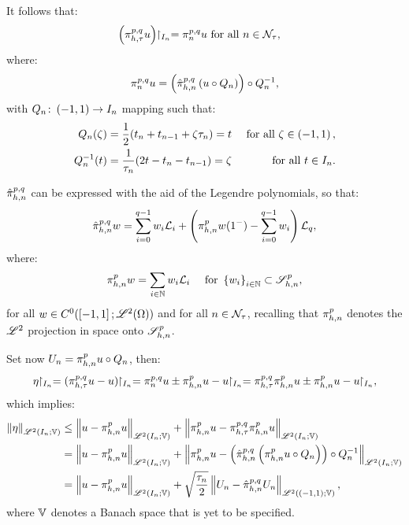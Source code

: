 It follows that:
\begin{align}
    \left( \pi_{h, \tau}^{p, q} u \right) \!\!\restriction_{I_n} = \pi^{p, q}_n u &\text{ for all } n \in \mathcal{N}_{\tau},
\end{align}
where:
\begin{align}
    \pi^{p, q}_n u = \left( \hat{\pi}_{h, n}^{p, q} \left( u \circ Q_n \right) \right) \circ Q_n^{-1},
\end{align}
with $Q_n \colon \left( -1, 1 \right) \rightarrow I_n$ mapping such that:
\begin{align}
    Q_n(\zeta) &= \frac{1}{2}(t_n + t_{n - 1} + \zeta \tau_n) = t &\text{ for all } \zeta \in \left( -1, 1 \right), \\
    Q_n^{-1}(t) &= \frac{1}{\tau_n}(2t - t_n - t_{n - 1}) = \zeta &\text{ for all } t \in I_n.
\end{align}

\begin{lemma} \label{lemma:legendre_interpolant}
    $\hat{\pi}_{h, n}^{p, q}$ can be expressed with the aid of the Legendre polynomials, so that:
    \begin{align}
        \hat{\pi}_{h, n}^{p, q} w = \sum_{i = 0}^{q - 1} w_i \mathcal{L}_i + \left( \pi_{h, n}^p w(1^-) - \sum_{i = 0}^{q - 1} w_i \right) \mathcal{L}_q,
    \end{align}
    where:
    \begin{align}
        \pi_{h, n}^p w &= \sum_{i \in \mathbb{N}} w_i \mathcal{L}_i &\text{ for } \left\{ w_i \right\}_{i \in \mathbb{N}} \subset \mathscr{S}^p_{h, n},
    \end{align}
    for all $w \in C^0(\left[ -1, 1 \right]; \mathscr{L}^{2}(\Omega))$ and for all $n \in \mathcal{N}_{\tau}$, recalling that $\pi_{h, n}^p$ denotes the $\mathscr{L}^{2}$ projection in space onto $\mathscr{S}^p_{h, n}$.
\end{lemma}

Set now $U_n = \pi_{h, n}^p u \circ Q_n$, then:
\begin{align}
    \eta \Restriction_{I_n} = (\InterpolantPQ u - u) \Restriction_{ I_n} = \InterpolantPQI u \pm \InterSol u - u \Restriction_{I_n} = \InterpolantPQ \InterSol u \pm \InterSol u - u \Restriction_{I_n},
\end{align}
which implies:
\begin{align}
    \left\lVert \eta \right\rVert_{\mathscr{L}^{2}(I_n; \mathbb{V})} & \leq \left\lVert u - \pi_{h, n}^p u \right\rVert_{\mathscr{L}^{2}(I_n; \mathbb{V})} + \left\lVert \pi_{h, n}^p u - \pi_{h, \tau}^{p, q} \pi_{h, n}^p u \right\rVert_{\mathscr{L}^{2}(I_n; \mathbb{V})} \notag \\
    &= \left\lVert u - \pi_{h, n}^p u \right\rVert_{\mathscr{L}^{2}(I_n; \mathbb{V})} + \left\lVert \pi_{h, n}^p u - \left( \hat{\pi}_{h, n}^{p, q} \left( \pi_{h, n}^p u \circ Q_n \right) \right) \circ Q_n^{-1} \right\rVert_{\mathscr{L}^{2}(I_n; \mathbb{V})} \notag \\
    &= \left\lVert u - \pi_{h, n}^p u \right\rVert_{\mathscr{L}^{2}(I_n; \mathbb{V})} + \sqrt{\frac{\tau_n}{2}} \left\lVert U_n - \hat{\pi}_{h, n}^{p, q} U_n \right\rVert_{\mathscr{L}^{2}(\left( -1, 1 \right); \mathbb{V})},
\end{align}
where $\mathbb{V}$ denotes a Banach space that is yet to be specified.

